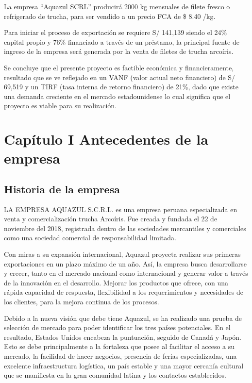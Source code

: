 \documentclass[
  stu,
  floatsintext,
  longtable,
  a4paper,
  nolmodern,
  notxfonts,
  notimes,
  colorlinks=true,linkcolor=blue,citecolor=blue,urlcolor=blue]{apa7}
\begin{document}
La empresa ``Aquazul SCRL'' producirá 2000 kg mensuales de filete fresco
o refrigerado de trucha, para ser vendido a un precio FCA de \$ 8.40
/kg.

Para iniciar el proceso de exportación se requiere S/ 141,139 siendo el
24\% capital propio y 76\% financiado a través de un préstamo, la
principal fuente de ingreso de la empresa será generada por la venta de
filetes de trucha arcoíris.

Se concluye que el presente proyecto es factible económica y
financieramente, resultado que se ve reflejado en un VANF (valor actual
neto financiero) de S/ 69,519 y un TIRF (tasa interna de retorno
financiero) de 21\%, dado que existe una demanda creciente en el mercado
estadounidense lo cual significa que el proyecto es viable para su
realización.

\section{Capítulo I Antecedentes de la
empresa}\label{capuxedtulo-i-antecedentes-de-la-empresa}

\subsection{Historia de la empresa}\label{historia-de-la-empresa}

LA EMPRESA AQUAZUL S.C.R.L. es una empresa peruana especializada en
venta y comercialización trucha Arcoíris. Fue creada y fundada el 22 de
noviembre del 2018, registrada dentro de las sociedades mercantiles y
comerciales como una sociedad comercial de responsabilidad limitada.

Con miras a su expansión internacional, Aquazul proyecta realizar sus
primeras exportaciones en un plazo máximo de un año. Así, la empresa
busca desarrollarse y crecer, tanto en el mercado nacional como
internacional y generar valor a través de la innovación en el
desarrollo. Mejorar los productos que ofrece, con una rápida capacidad
de respuesta, flexibilidad a los requerimientos y necesidades de los
clientes, para la mejora continua de los procesos.

Debido a la nueva visión que debe tiene Aquazul, se ha realizado una
prueba de selección de mercado para poder identificar los tres países
potenciales. En el resultado, Estados Unidos encabeza la puntuación,
seguido de Canadá y Japón. Esto se debe principalmente a la fortaleza
que posee al facilitar el acceso a su mercado, la facilidad de hacer
negocios, presencia de ferias especializadas, una excelente
infraestructura logística, un país estable y una mayor cercanía cultural
que se manifiesta en la gran comunidad latina y los contactos
establecidos.
\end{document}
